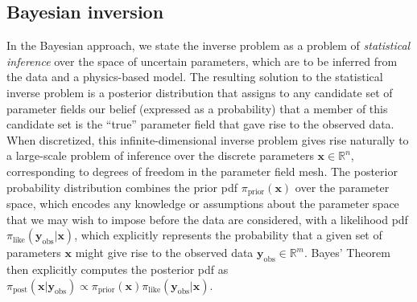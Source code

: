 \documentclass[11pt,final]{article}%
\renewcommand{\vec}[1] {\ensuremath{\boldsymbol{#1}}}
\begin{document}
\subsection{Bayesian inversion}\label{sec:bayesian}
In the Bayesian approach, we state the inverse problem as a problem of \emph{statistical inference} over the space of uncertain parameters, which are to be inferred from the data and a physics-based model. The resulting solution to the statistical inverse problem is a posterior distribution that assigns to any candidate set of parameter fields our belief (expressed as a probability) that a member of this candidate set is the ``true'' parameter field that gave rise to the observed data.
%
When discretized, this  infinite-dimensional inverse problem  gives rise naturally to a large-scale problem of inference over the discrete parameters $\vec{x} \in \mathbb R^n$, corresponding to degrees of freedom in the parameter field mesh. The posterior probability distribution combines the prior pdf $\pi_{\text{prior}}(\vec{x})$ over the parameter space, which encodes any knowledge or assumptions about the parameter space that we may
wish to impose before the data are considered, with a likelihood pdf $\pi_{\text{like}}(\vec{y}_{\text{obs}}|\vec{x})$, which explicitly represents the probability that a given set of parameters $\vec{x}$ might give rise to the observed data $\vec{y}_{\text{obs}} \in \mathbb{R}^m$.  Bayes' Theorem then explicitly computes the posterior pdf as
$ \pi_{\text{post}}(\vec{x} | \vec{y}_{\text{obs}}) \propto
\pi_{\text{prior}}(\vec{x}) \pi_{\text{like}}(\vec{y}_{\text{obs}} | \vec{x})$.
\end{document}
